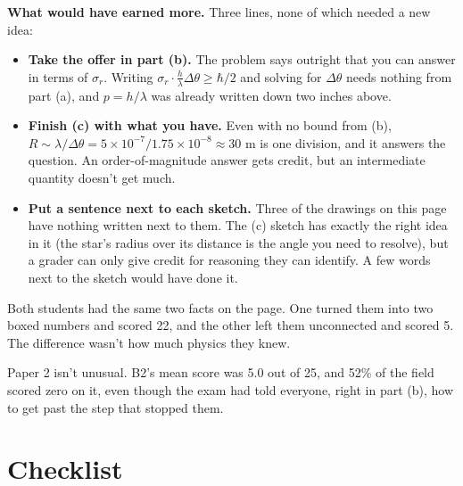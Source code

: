 \documentclass[11pt]{article}
\begin{document}
\textbf{What would have earned more.} Three lines, none of which needed a new idea:

\begin{itemize}\setlength{\itemsep}{2pt}
\item \textbf{Take the offer in part (b).} The problem says outright that you can answer in
terms of $\sigma_r$. Writing $\sigma_r \cdot \tfrac{h}{\lambda}\Delta\theta \ge \hbar/2$
and solving for $\Delta\theta$ needs nothing from part (a), and $p = h/\lambda$ was already
written down two inches above.
\item \textbf{Finish (c) with what you have.} Even with no bound from (b), $R \sim
\lambda/\Delta\theta = 5\times10^{-7} / 1.75\times10^{-8} \approx 30$ m is one division,
and it answers the question. An order-of-magnitude answer gets credit, but an intermediate
quantity doesn't get much.
\item \textbf{Put a sentence next to each sketch.} Three of the drawings on this page have
nothing written next to them. The (c) sketch has exactly the right idea in it (the star's
radius over its distance is the angle you need to resolve), but a grader can only give
credit for reasoning they can identify. A few words next to the sketch would have done it.
\end{itemize}

\begin{keybox}
Both students had the same two facts on the page. One turned them into two boxed numbers
and scored 22, and the other left them unconnected and scored 5. The difference wasn't how
much physics they knew.

Paper 2 isn't unusual. B2's mean score was 5.0 out of 25, and 52\% of the field scored zero
on it, even though the exam had told everyone, right in part (b), how to get past the step
that stopped them.
\end{keybox}

\section{Checklist}
\end{document}
